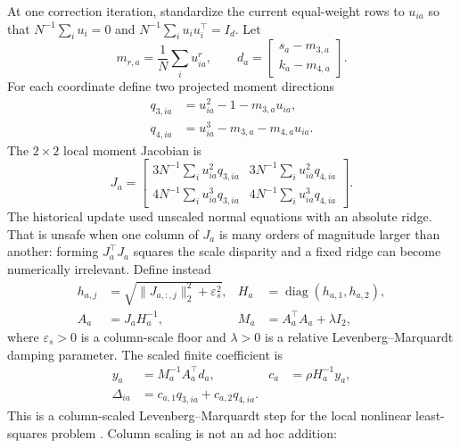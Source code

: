 At one correction iteration, standardize the current equal-weight rows to
\(u_{ia}\) so that \(N^{-1}\sum_i u_i=0\) and
\(N^{-1}\sum_i u_i u_i^\top=I_d\).  Let
\begin{equation}
 m_{r,a}=\frac1N\sum_i u_{ia}^r,
 \qquad d_a=\begin{bmatrix}s_a-m_{3,a}\\ k_a-m_{4,a}\end{bmatrix}.
 \label{eq:bf-eot-hm-moment-residual}
\end{equation}
For each coordinate define two projected moment directions
\begin{align}
 q_{3,ia}&=u_{ia}^2-1-m_{3,a}u_{ia},\\
 q_{4,ia}&=u_{ia}^3-m_{3,a}-m_{4,a}u_{ia}.
 \label{eq:bf-eot-hm-directions}
\end{align}
The \(2\times2\) local moment Jacobian is
\begin{equation}
 J_a=
 \begin{bmatrix}
 3N^{-1}\sum_i u_{ia}^2q_{3,ia} &
 3N^{-1}\sum_i u_{ia}^2q_{4,ia}\\
 4N^{-1}\sum_i u_{ia}^3q_{3,ia} &
 4N^{-1}\sum_i u_{ia}^3q_{4,ia}
 \end{bmatrix}.
 \label{eq:bf-eot-hm-jacobian}
\end{equation}
The historical update used unscaled normal equations with an absolute ridge.
That is unsafe when one column of \(J_a\) is many orders of magnitude larger
than another: forming \(J_a^\top J_a\) squares the scale disparity and a fixed
ridge can become numerically irrelevant.  Define instead
\begin{align}
 h_{a,j}&=\sqrt{\lVert J_{a,:,j}\rVert_2^2+\varepsilon_s^2},
 &H_a&=\operatorname{diag}(h_{a,1},h_{a,2}),\\
 A_a&=J_aH_a^{-1},
 &M_a&=A_a^\top A_a+\lambda I_2,
 \label{eq:bf-eot-hm-scaled-lm-system}
\end{align}
where \(\varepsilon_s>0\) is a column-scale floor and \(\lambda>0\) is a
relative Levenberg--Marquardt damping parameter.  The scaled finite coefficient
is
\begin{align}
 y_a&=M_a^{-1}A_a^\top d_a,
 &c_a&=\rho H_a^{-1}y_a,
 \label{eq:bf-eot-hm-coefficients}\\
 \Delta_{ia}&=c_{a,1}q_{3,ia}+c_{a,2}q_{4,ia}.
 \label{eq:bf-eot-hm-correction}
\end{align}
This is a column-scaled Levenberg--Marquardt step for the local nonlinear
least-squares problem \citep{marquardt1963algorithm}.  Column scaling is not
an ad hoc addition: \citet[Sec.~3, steps (iii) and Note (ii)]{osborne1976levenberg}
